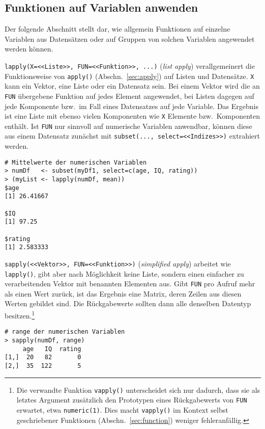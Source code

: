 \subsection{Funktionen auf Variablen anwenden}
\label{sec:sapply}

Der folgende Abschnitt stellt dar, wie allgemein Funktionen auf einzelne Variablen aus Datensätzen oder auf Gruppen von solchen Variablen angewendet werden können.

\lstinline!lapply(X=<<Liste>>, FUN=<<Funktion>>, ...)! (\emph{list apply}) verallgemeinert die Funktionsweise von \lstinline!apply()! (Abschn.\ \ref{sec:apply}) auf Listen und Datensätze. \lstinline!X! kann ein Vektor, eine Liste oder ein Datensatz sein. Bei einem Vektor wird die an \lstinline!FUN! übergebene Funktion auf jedes Element angewendet, bei Listen dagegen auf jede Komponente bzw.\ im Fall eines Datensatzes auf jede Variable. Das Ergebnis ist eine Liste mit ebenso vielen Komponenten wie \lstinline!X! Elemente bzw.\ Komponenten enthält. Ist \lstinline!FUN! nur sinnvoll auf numerische Variablen anwendbar, können diese aus einem Datensatz zunächst mit \lstinline!subset(..., select=<<Indizes>>)! extrahiert werden.
\begin{lstlisting}
# Mittelwerte der numerischen Variablen
> numDf   <- subset(myDf1, select=c(age, IQ, rating))
> (myList <- lapply(numDf, mean))
$age
[1] 26.41667

$IQ
[1] 97.25

$rating
[1] 2.583333
\end{lstlisting}

\lstinline!sapply(<<Vektor>>, FUN=<<Funktion>>)! (\emph{simplified apply}) arbeitet wie \lstinline!lapply()!, gibt aber nach Möglichkeit keine Liste, sondern einen einfacher zu verarbeitenden Vektor mit benannten Elementen aus. Gibt \lstinline!FUN! pro Aufruf mehr als einen Wert zurück, ist das Ergebnis eine Matrix, deren Zeilen aus diesen Werten gebildet sind. Die Rückgabewerte sollten dann alle denselben Datentyp besitzen.\footnote{Die verwandte Funktion \lstinline!vapply()! unterscheidet sich nur dadurch, dass sie als letztes Argument zusätzlich den Prototypen eines Rückgabewerts von \lstinline!FUN! erwartet, etwa \lstinline!numeric(1)!. Dies macht \lstinline!vapply()! im Kontext selbst geschriebener Funktionen (Abschn.\ \ref{sec:function}) weniger fehleranfällig.}
\begin{lstlisting}
# range der numerischen Variablen
> sapply(numDf, range)
     age   IQ  rating
[1,]  20   82       0
[2,]  35  122       5
\end{lstlisting}

